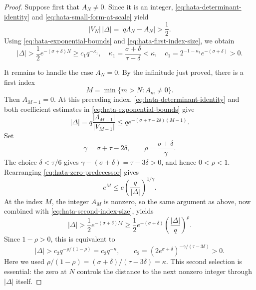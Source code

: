 \documentclass[11pt,reqno,letterpaper]{amsart}
\numberwithin{equation}{section}
\theoremstyle{definition}
\theoremstyle{remark}
\begin{document}
\begin{proof}
Suppose first that \(A_N\ne0\).  Since it is an integer,
\eqref{eq:hata-determinant-identity} and
\eqref{eq:hata-small-form-at-scale} yield
\[
 |V_N|\,|\Delta|=|q\Lambda_N-A_N|>\frac12.
\]
Using \eqref{eq:hata-exponential-bounds} and
\eqref{eq:hata-first-index-size}, we obtain
\begin{equation}\label{eq:hata-case-one}
 |\Delta|>\frac12e^{-(\sigma+\delta)N}
 \geq c_1q^{-\kappa_1},
 \quad
 \kappa_1=\frac{\sigma+\delta}{\tau-\delta}<\kappa,
 \quad
 c_1=2^{-1-\kappa_1}e^{-(\sigma+\delta)}>0.
\end{equation}

It remains to handle the case \(A_N=0\).  By the infinitude just proved,
there is a first index
\[
 M=\min\{m>N:A_m\ne0\}.
\]
Then \(A_{M-1}=0\).  At this preceding index,
\eqref{eq:hata-determinant-identity} and both coefficient estimates in
\eqref{eq:hata-exponential-bounds} give
\begin{equation}\label{eq:hata-zero-predecessor}
 |\Delta|=q\frac{|\Lambda_{M-1}|}{|V_{M-1}|}
 \leq q e^{-(\sigma+\tau-2\delta)(M-1)}.
\end{equation}
Set
\[
 \gamma=\sigma+\tau-2\delta,
 \qquad \rho=\frac{\sigma+\delta}{\gamma}.
\]
The choice \(\delta<\tau/6\) gives
\(\gamma-(\sigma+\delta)=\tau-3\delta>0\), and hence
\(0<\rho<1\).  Rearranging \eqref{eq:hata-zero-predecessor} gives
\begin{equation}\label{eq:hata-second-index-size}
 e^M\leq e\left(\frac q{|\Delta|}\right)^{1/\gamma}.
\end{equation}
At the index \(M\), the integer \(A_M\) is nonzero, so the same argument
as above, now combined with \eqref{eq:hata-second-index-size}, yields
\[
 |\Delta|>\frac12e^{-(\sigma+\delta)M}
 \geq\frac12e^{-(\sigma+\delta)}
 \left(\frac{|\Delta|}{q}\right)^\rho.
\]
Since \(1-\rho>0\), this is equivalent to
\begin{equation}\label{eq:hata-case-two}
 |\Delta|>c_2q^{-\rho/(1-\rho)}=c_2q^{-\kappa},
 \qquad
 c_2=\left(2e^{\sigma+\delta}\right)^{-\gamma/(\tau-3\delta)}>0.
\end{equation}
Here we used
\(\rho/(1-\rho)=(\sigma+\delta)/(\tau-3\delta)=\kappa\).
This second selection is essential: the zero at \(N\) controls the
distance to the next nonzero integer through \(|\Delta|\) itself.


\end{proof}
\end{document}
